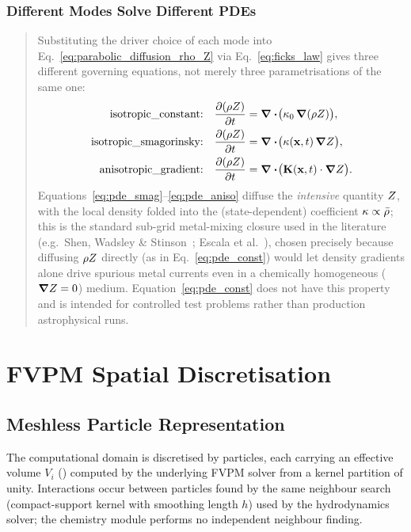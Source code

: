 \subsubsection{Different Modes Solve Different PDEs}
\label{sec:pde-per-mode}
\begin{quote}
Substituting the driver choice of each mode into
Eq.~\eqref{eq:parabolic_diffusion_rho_Z} via Eq.~\eqref{eq:ficks_law}
gives three different governing equations, not merely three
parametrisations of the same one:
\begin{align}
  \text{isotropic\_constant:} &\quad
    \pdv{(\rho Z)}{t} = \div\!\big(\kappa_{0}\, \grad(\rho Z)\big) ,
    \label{eq:pde_const}\\
  \text{isotropic\_smagorinsky:} &\quad
    \pdv{(\rho Z)}{t} = \div\!\big(\kappa(\mathbf x,t)\, \grad Z\big) ,
    \label{eq:pde_smag}\\
  \text{anisotropic\_gradient:} &\quad
    \pdv{(\rho Z)}{t} = \div\!\big(\mathbf{K}(\mathbf x,t) \cdot \grad Z\big) .
    \label{eq:pde_aniso}
\end{align}
Equations~\eqref{eq:pde_smag}--\eqref{eq:pde_aniso} diffuse the
\emph{intensive} quantity $Z$, with the local density folded into
the (state-dependent) coefficient $\kappa \propto \bar\rho$; this is the
standard sub-grid metal-mixing closure used in the literature
(e.g.\ Shen, Wadsley \& Stinson~\citeyear{ShenWadsleyStinson2010}; Escala et al.~\citeyear{Escala2018}), chosen
precisely because diffusing $\rho Z$ directly (as in
Eq.~\eqref{eq:pde_const}) would let density gradients alone drive
spurious metal currents even in a chemically homogeneous ($\grad Z = 0$)
medium. Equation~\eqref{eq:pde_const} does not have this property and is
intended for controlled test problems rather than production
astrophysical runs.
\end{quote}

\section{FVPM Spatial Discretisation}
\label{sec:fvpm-geometry}

\subsection{Meshless Particle Representation}
The computational domain is discretised by particles, each carrying an
effective volume $V_i$ () computed by the
underlying FVPM solver from a kernel partition of unity.
Interactions occur between particles found by the same neighbour search
(compact-support kernel with smoothing length $h$) used by the
hydrodynamics solver; the chemistry module performs no independent
neighbour finding.

